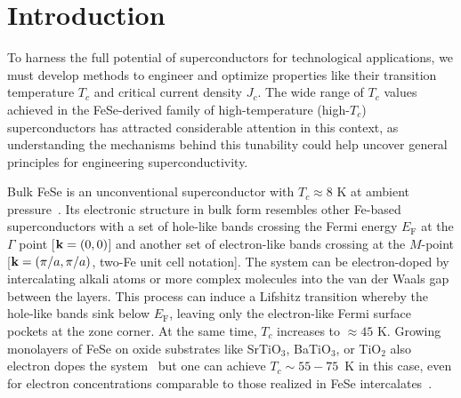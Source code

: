 \documentclass[prb,twocolumn,amsmath,amssymb,superscriptaddress,floatfix,nofootinbib]{revtex4-2}
\begin{document}
\section{Introduction}
To harness the full potential of superconductors for technological applications, we must develop methods to engineer and optimize properties like their transition temperature $T_c$ and critical current density $J_c$. The wide range of $T_c$ values achieved in the FeSe-derived family of high-temperature (high-$T_c$) superconductors \cite{KreiselSymmetry2020, Hsu14262, WangCPL2012, NOJI20148, BurrardLucasNatMat2013, DingPRL2016, Liu2012, He2013, DingNatCommun2013, Ge2015, Shi2017, GuoPRB2010, PhysRevB.80.064506, Medvedev2009, MiyataNatMat2015, SongPRL2016, Krzton_Maziopa_2012, Sun2015} has attracted considerable attention in this context, as understanding the mechanisms behind this tunability could help uncover general principles for engineering superconductivity.   

Bulk FeSe is an unconventional superconductor with $T_c\approx 8$ K at ambient pressure~\cite{Hsu14262}. Its electronic structure in bulk form resembles other Fe-based superconductors with a set of hole-like bands crossing the Fermi energy $E_\mathrm{F}$ at the $\Gamma$ point [${\bf k} = (0,0)$] and another set of electron-like bands crossing at the $M$-point [${\bf k} = (\pi/a,\pi/a)$, two-Fe unit cell notation]. The system can be electron-doped by intercalating alkali atoms \cite{GuoPRB2010, DingNatCommun2013} or more complex molecules \cite{NOJI20148, BurrardLucasNatMat2013, Krzton_Maziopa_2012, Sun2015} into the van der Waals gap between the layers. This process can induce a Lifshitz transition whereby the hole-like bands sink below $E_\mathrm{F}$, leaving only the electron-like Fermi surface pockets at the zone corner. At the same time, $T_c$ increases to $\approx 45$ K. Growing monolayers of FeSe on oxide substrates like SrTiO$_3$, BaTiO$_3$, or TiO$_2$ also electron dopes the system~\cite{Liu2012} but one can achieve $T_c \sim 55-75$~K in this case, even for electron concentrations comparable to those realized in FeSe intercalates~\cite{WangCPL2012, Liu2012, He2013, Ge2015}. 
\end{document}
